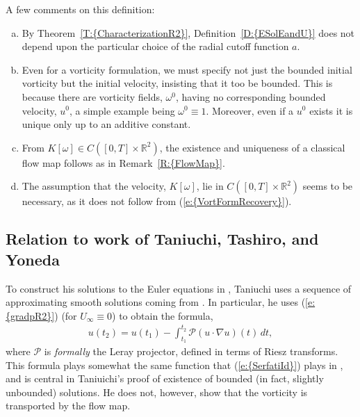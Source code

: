 \documentclass[reqno,openright,11pt,twoside]{amsart}
\theoremstyle{definition}
\numberwithin{equation}{section}
\begin{document}
A few comments on this definition:

\begin{enumerate}[(a)]
    \item
        By {Theorem~\ref{T:{CharacterizationR2}}}, {Definition~\ref{D:{ESolEandU}}} does not depend
        upon the particular choice of the radial cutoff function $a$.
        
    \item
        Even for a vorticity formulation, we must specify not just the
        bounded initial vorticity but the initial velocity, insisting
        that it too be bounded. This is because there are vorticity
        fields, $\omega^0$, having no corresponding
        bounded velocity, $u^0$, a simple example being
        $\omega^0 \equiv 1$. Moreover, even if a $u^0$ exists it is
        unique only up to an additive constant.
        
    \item
        From $K[\omega] \in C([0, T] \times {\ensuremath{{\ensuremath{\mathbb{{R}}}}}}^2)$, the existence
        and uniqueness of a classical flow map follows as in
        {Remark~\ref{R:{FlowMap}}}.
        
    \item
        The assumption that the velocity, $K[\omega]$, lie in
        $C([0, T] \times {\ensuremath{{\ensuremath{\mathbb{{R}}}}}}^2)$ seems to be necessary, as it does not
        follow from {(\ref{e:{VortFormRecovery}})}.
        
        
\end{enumerate}

\subsection{Relation to work of Taniuchi, Tashiro, and Yoneda}\label{S:TTYWork}
To construct his solutions to the Euler equations in \cite{Taniuchi2004}, Taniuchi uses a sequence of approximating smooth solutions coming from \cite{Serfati1995B}. In particular, he uses {(\ref{e:{gradpR2}})} (for $U_{\ensuremath{\infty}} \equiv 0$) to obtain the formula,
\begin{align*}
	u(t_2)
		= u(t_1) - \int_{t_1}^{t_2} {\ensuremath{{\ensuremath{\mathcal{{P}}}}}} (u \cdot {\ensuremath{\nabla}} u)(t) \, dt,
\end{align*}
where ${\ensuremath{{\ensuremath{\mathcal{{P}}}}}}$ is \textit{formally} the Leray projector, defined in terms of Riesz transforms. This formula plays somewhat the same function that {(\ref{e:{SerfatiId}})} plays in \cite{AKLL2014}, and is central in Taniuichi's proof of  existence of bounded (in fact, slightly unbounded) solutions. He does not, however, show that the vorticity is transported by the flow map.
\end{document}
